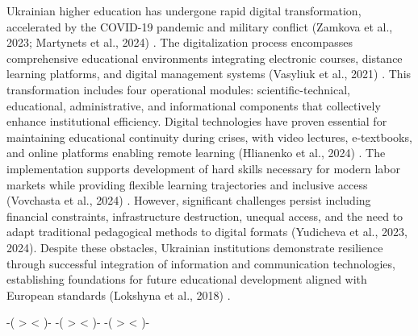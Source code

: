 Ukrainian higher education has undergone rapid digital transformation, accelerated by the COVID-19 pandemic and military conflict (Zamkova et al., 2023; Martynets et al., 2024) \cite{Zamkova2023299}. The digitalization process encompasses comprehensive educational environments integrating electronic courses, distance learning platforms, and digital management systems (Vasyliuk et al., 2021) \cite{Vasyliuk2021161}. This transformation includes four operational modules: scientific-technical, educational, administrative, and informational components that collectively enhance institutional efficiency.
Digital technologies have proven essential for maintaining educational continuity during crises, with video lectures, e-textbooks, and online platforms enabling remote learning (Hlianenko et al., 2024) \cite{Hlianenko2024}. The implementation supports development of hard skills necessary for modern labor markets while providing flexible learning trajectories and inclusive access (Vovchasta et al., 2024) \cite{Vovchasta2024}.
However, significant challenges persist including financial constraints, infrastructure destruction, unequal access, and the need to adapt traditional pedagogical methods to digital formats (Yudicheva et al., 2023, 2024)\cite{Yudicheva202424, Yudicheva2023129}. Despite these obstacles, Ukrainian institutions demonstrate resilience through successful integration of information and communication technologies, establishing foundations for future educational development aligned with European standards (Lokshyna et al., 2018) \cite{Lokshyna2018302}.

 -( > < )- -( >  < )- -( >  < )-


